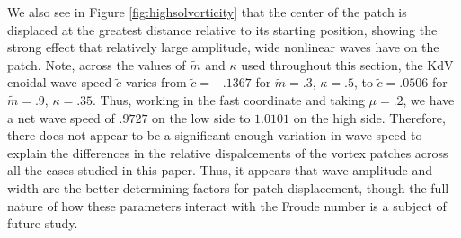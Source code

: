 \documentclass[a4paper,11pt]{article}
\begin{document}
We also see in Figure \ref{fig:highsolvorticity} that the center of the patch is displaced at the greatest distance relative to its starting position, showing the strong effect that relatively large amplitude, wide nonlinear waves have on the patch.  Note, across the values of $\tilde{m}$ and $\kappa$ used throughout this section, the KdV cnoidal wave speed $\tilde{c}$ varies from $\tilde{c}=-.1367$ for $\tilde{m}=.3$, $\kappa =.5$, to $\tilde{c}=.0506$ for $\tilde{m}=.9$, $\kappa=.35$.  Thus, working in the fast coordinate and taking $\mu=.2$, we have a net wave speed of $.9727$ on the low side to $1.0101$ on the high side.  Therefore, there does not appear to be a significant enough variation in wave speed to explain the differences in the relative dispalcements of the vortex patches across all the cases studied in this paper.  Thus, it appears that wave amplitude and width are the better determining factors for patch displacement, though the full nature of how these parameters interact with the Froude number is a subject of future study.  
\end{document}
